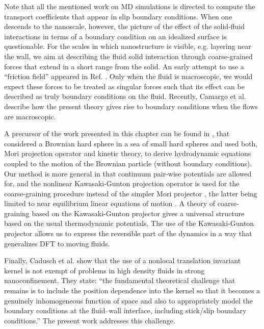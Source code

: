 \documentclass[b5paper,openright,10pt]{book}
\begin{document}
Note that  all the  mentioned work  on MD  simulations is  directed to
compute  the  transport  coefficients  that appear  in  slip  boundary
conditions.  When one descends to  the nanoscale, however, the picture
of the effect  of the solid-fluid interactions in terms  of a boundary
condition on an idealized surface  is questionable.  For the scales in
which nanostructure is  visible, e.g.  layering near the  wall, we aim
at  describing  the  fluid solid  interaction  through  coarse-grained
forces that extend  in a short range from the  solid. An early attempt
to use a ``friction field''  appeared in Ref. \cite{Sokhan2002}.
Only when the  fluid is  macroscopic, we  would expect  these forces  to be
treated as  singular forces such that  its effect can be  described as
truly boundary  conditions on  the fluid. Recently, Camargo et al. \cite{CamargoBC2018} describe how the present theory gives rise to boundary conditions when the flows are macroscopic.

A precursor of the work presented in this chapter can be found in \cite{Cukier1980},  that considered a Brownian
hard  sphere in  a  sea of  small  hard spheres  and  used both,  Mori
projection  operator  and  kinetic   theory,  to  derive  hydrodynamic
equations  coupled to  the motion  of the  Brownian particle  (without
boundary conditions).   Our method is  more general in  that continuum
pair-wise   potentials   are   allowed   for,   and   the   nonlinear
Kawasaki-Gunton  projection operator  \cite{Kawasaki1973a} is  used for
the   coarse-graining   procedure   instead  of   the   simpler   Mori
projector \cite{Huang2014},   the   latter   being  limited   to   near
equilibrium linear  equations of motion \cite{Grabert1982}.   A theory
of  coarse-graining based  on  the Kawasaki-Gunton  projector gives  a
universal structure based on  the usual thermodynamic potentials.  The
use  of  the  Kawasaki-Gunton  projector  allows  us  to  express  the
reversible  part of  the dynamics  in a  way that  generalizes DFT to moving fluids.

Finally, Cadusch et al.  \cite{Cadusch2008}  show   that  the  use  of  a
nonlocal translation invariant kernel is not exempt  of problems in high
density fluids in strong nanoconfinement. They state: ``the fundamental
theoretical  challenge  that  remains   is  to  include  the  position
dependence  into   the  kernel   so  that   it  becomes   a  genuinely
inhomogeneous function  of space and  also to appropriately  model the
boundary conditions at the  fluid–wall interface, including stick/slip
boundary conditions.'' The present work addresses this challenge.
\end{document}

